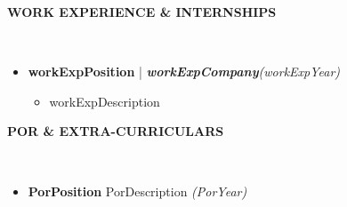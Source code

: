 \documentclass[a4paper,10pt]{article}
\newcommand{\resheading}[1]{{\small \colorbox{mygrey}{\begin{minipage}{0.99\textwidth}{\textbf{#1 \vphantom{p\^{E}}}}\end{minipage}}}}
\begin{document}
\noindent
\resheading{\textbf{WORK EXPERIENCE \& INTERNSHIPS}}\\[-0.3cm]
\begin{itemize}[noitemsep,nolistsep]
    \item \textbf{workExpPosition} | \textbf{\emph{workExpCompany}}\hfill \emph{(workExpYear)}\\[-0.6cm]
    \begin{itemize}[noitemsep]
        \item workExpDescription
    \end{itemize}
\end{itemize}

\noindent
\resheading{\textbf{POR \& EXTRA-CURRICULARS}}\\[-0.4cm]
\begin{itemize}
\setlength\itemsep{-0.4em}
\item \textbf{PorPosition} PorDescription \emph{(PorYear)}

\end{itemize}
\end{document}
